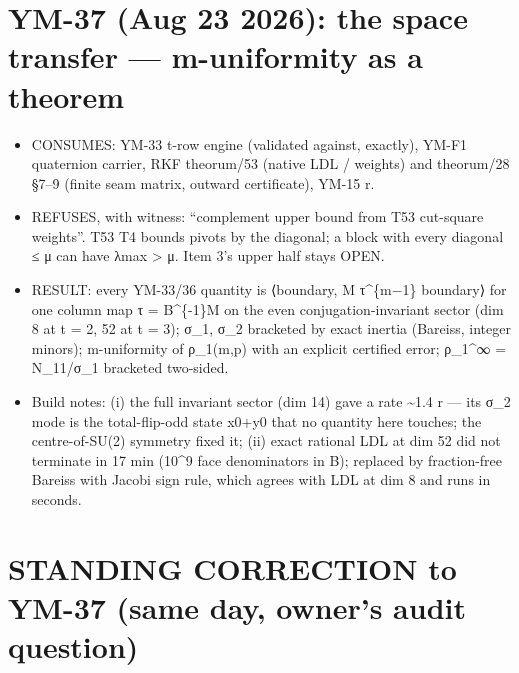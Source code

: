 \hypertarget{ym-37-aug-23-2026-the-space-transfer-m-uniformity-as-a-theorem}{%
\section{YM-37 (Aug 23 2026): the space transfer --- m-uniformity as a theorem}\label{ym-37-aug-23-2026-the-space-transfer-m-uniformity-as-a-theorem}}

\begin{itemize}
\tightlist
\item
  CONSUMES: YM-33 t-row engine (validated against, exactly), YM-F1
  quaternion carrier, RKF theorum/53 (native LDL / weights) and
  theorum/28 §7--9 (finite seam matrix, outward certificate), YM-15 r.
\item
  REFUSES, with witness: ``complement upper bound from T53 cut-square
  weights''. T53 T4 bounds pivots by the diagonal; a block with every
  diagonal ≤ μ can have λmax \textgreater{} μ. Item 3's upper half stays OPEN.
\item
  RESULT: every YM-33/36 quantity is ⟨boundary, M τ\^{}\{m−1\} boundary⟩ for
  one column map τ = B\^{}\{-1\}M on the even conjugation-invariant sector
  (dim 8 at t = 2, 52 at t = 3); σ\_1, σ\_2 bracketed by exact inertia
  (Bareiss, integer minors); m-uniformity of ρ\_1(m,p) with an explicit
  certified error; ρ\_1\^{}∞ = N\_11/σ\_1 bracketed two-sided.
\item
  Build notes: (i) the full invariant sector (dim 14) gave a rate \textasciitilde1.4 r ---
  its σ\_2 mode is the total-flip-odd state x0+y0 that no quantity here
  touches; the centre-of-SU(2) symmetry fixed it; (ii) exact rational
  LDL at dim 52 did not terminate in 17 min (10\^{}9 face denominators in
  B); replaced by fraction-free Bareiss with Jacobi sign rule, which
  agrees with LDL at dim 8 and runs in seconds.
\end{itemize}

\hypertarget{standing-correction-to-ym-37-same-day-owners-audit-question}{%
\section{STANDING CORRECTION to YM-37 (same day, owner's audit question)}\label{standing-correction-to-ym-37-same-day-owners-audit-question}}

